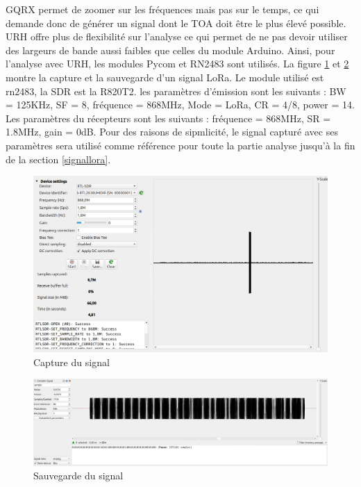 GQRX permet de zoomer sur les fréquences mais pas sur le temps, ce qui demande donc de générer un signal dont le TOA doit être le plus élevé possible. \ac{URH} offre plus de flexibilité sur l'analyse ce qui permet de ne pas devoir utiliser des largeurs de bande aussi faibles que celles du module Arduino. Ainsi, pour l'analyse avec \ac{URH}, les modules Pycom et RN2483 sont utilisés. La figure \ref{term303} et \ref{term304} montre la capture et la sauvegarde d'un signal LoRa. Le module utilisé est rn2483, la SDR est la R820T2. les paramètres d'émission sont les suivants : \ac{BW} = 125KHz, \ac{SF} = 8, fréquence = 868MHz, Mode = \ac{LoRa}, \ac{CR} = 4/8, power = 14. Les paramètres du récepteurs sont les suivants : fréquence = 868MHz, \ac{SR} = 1.8MHz, gain = 0dB. Pour des raisons de sipmlicité, le signal capturé avec ses paramètres sera utilisé comme référence pour toute la partie analyse jusqu'à la fin de la section \ref{signallora}.

\newpage

\begin{figure}[h]
\centering

\includegraphics[scale=0.17]{images/urh2n.png}
\caption{Capture du signal}
\label{term303}
\end{figure}

\begin{figure}[h]
\centering

\includegraphics[scale=0.11]{images/urh3n.png}
\caption{Sauvegarde du signal}
\label{term304}
\end{figure}

